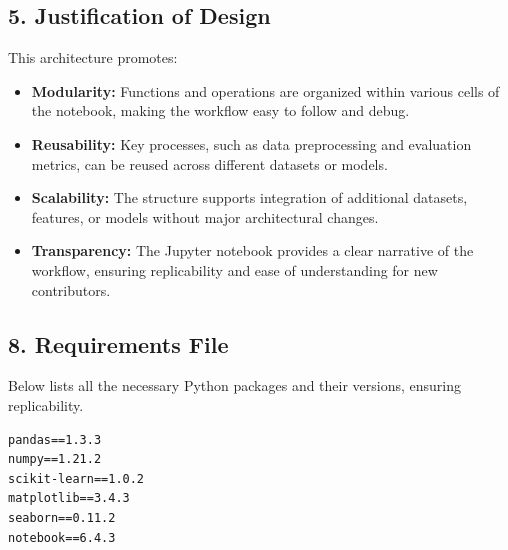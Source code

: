 \documentclass[10pt,twocolumn]{article}
\begin{document}
\subsection{5. Justification of Design}
This architecture promotes:
\begin{itemize}
    \item \textbf{Modularity:} Functions and operations are organized within various cells of the notebook, making the workflow easy to follow and debug.
    \item \textbf{Reusability:} Key processes, such as data preprocessing and evaluation metrics, can be reused across different datasets or models.
    \item \textbf{Scalability:} The structure supports  integration of additional datasets, features, or models without major architectural changes.
    \item \textbf{Transparency:} The Jupyter notebook provides a clear narrative of the workflow, ensuring replicability and ease of understanding for new contributors.
\end{itemize}
\subsection*{8. Requirements File}
Below lists all the necessary Python packages and their versions, ensuring replicability.
\begin{verbatim}
pandas==1.3.3
numpy==1.21.2
scikit-learn==1.0.2
matplotlib==3.4.3
seaborn==0.11.2
notebook==6.4.3
\end{verbatim}
\end{document}
